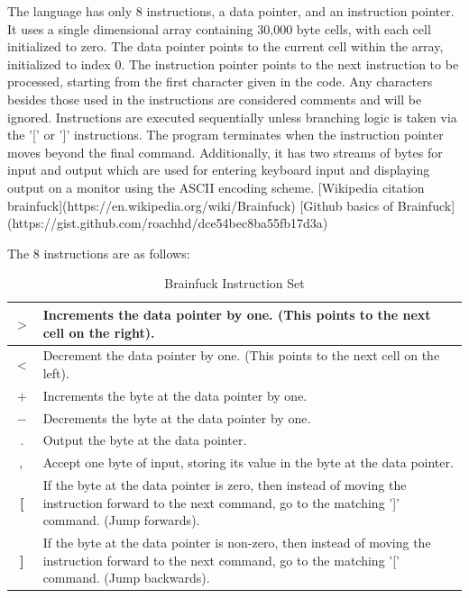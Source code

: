 The language has only 8 instructions, a data pointer, and an instruction pointer.
It uses a single dimensional array containing 30,000 byte cells, with each cell initialized to zero.
The data pointer points to the current cell within the array, initialized to index 0.
The instruction pointer points to the next instruction to be processed, starting from the first character given in the code.
Any characters besides those used in the instructions are considered comments and will be ignored.
Instructions are executed sequentially unless branching logic is taken via the '[' or ']' instructions.
The program terminates when the instruction pointer moves beyond the final command.
Additionally, it has two streams of bytes for input and output which are used for entering keyboard input and displaying output on a monitor using the ASCII encoding scheme.
[Wikipedia citation brainfuck](https://en.wikipedia.org/wiki/Brainfuck)
[Github basics of Brainfuck](https://gist.github.com/roachhd/dce54bec8ba55fb17d3a)

The 8 instructions are as follows:
\begin{table}[h!tb]
    \centering
    \begin{tabular}{|c|p{10cm}|}
        \hline
        \textbf{$>$} & Increments the data pointer by one. (This points to the next cell on the right). \\
        \hline
        \textbf{$<$} & Decrement the data pointer by one. (This points to the next cell on the left). \\
        \hline
        \textbf{$+$} & Increments the byte at the data pointer by one. \\
        \hline
        \textbf{$-$} & Decrements the byte at the data pointer by one. \\
        \hline
        \textbf{$.$} & Output the byte at the data pointer. \\
        \hline
        \textbf{$,$} & Accept one byte of input, storing its value in the byte at the data pointer.\\
        \hline
        \textbf{[} & If the byte at the data pointer is zero, then instead of moving the instruction forward to the next command, go to the matching ']' command. (Jump forwards). \\
        \hline
        \textbf{]} & If the byte at the data pointer is non-zero, then instead of moving the instruction forward to the next command, go to the matching '[' command. (Jump backwards). \\
        \hline
    \end{tabular}
    \caption{Brainfuck Instruction Set}
    \label{tab:BrainfuckInstructionSet}
\end{table}

